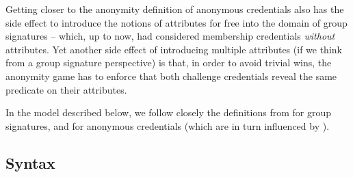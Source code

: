 Getting closer to the anonymity definition of anonymous credentials also has the
side effect to introduce the notions of attributes for free into the domain of
group signatures -- which, up to now, had considered membership credentials
\emph{without} attributes. Yet another side effect of introducing multiple
attributes (if we think from a group signature perspective) is that, in order
to avoid trivial wins, the anonymity game has to enforce that both challenge
credentials reveal the same predicate on their attributes.

In the model described below, we follow closely the definitions from
\cite{bsz05} for group signatures, and \cite{fhs19} for anonymous credentials
(which are in turn influenced by \cite{bsz05}).

\subsection{Syntax}
\label{ssec:syntax}

